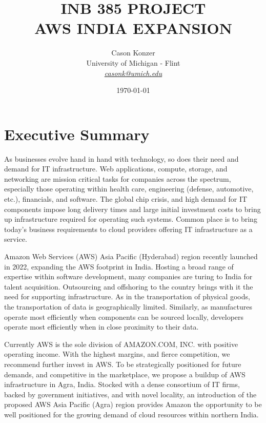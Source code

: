\documentclass[a4paper, 12pt]{article}
\date{\today} %
\begin{document}
\title{INB 385 PROJECT \\ AWS INDIA EXPANSION}
\author{Cason Konzer   \\ 
       University of Michigan - Flint \\ 
       \textit{ \color{violet}
       \href{mailto:casonk@umich.edu}{casonk@umich.edu}}  %
       }
\maketitle
\newpage

\section*{Executive Summary}

As businesses evolve hand in hand with technology, so does their need and demand for IT infrastructure. 
Web applications, compute, storage, and networking are mission critical tasks for companies across the spectrum, especially those operating within health care, engineering (defense, automotive, etc.), financials, and software. 
The global chip crisis, and high demand for IT components impose long delivery times and large initial investment costs to bring up infrastructure required for operating such systems. 
Common place is to bring today's business requirements to cloud providers offering IT infrastructure as a service. 

Amazon Web Services (AWS) Asia Pacific (Hyderabad) region recently launched in 2022, expanding the AWS footprint in India. 
Hosting a broad range of expertise within software development, many companies are turing to India for talent acquisition. 
Outsourcing and offshoring to the country brings with it the need for supporting infrastructure. 
As in the transportation of physical goods, the transportation of data is geographically limited. 
Similarly, as manufactures operate most efficiently when components can be sourced locally, developers operate most efficiently when in close proximity to their data. 

Currently AWS is the sole division of AMAZON.COM, INC. with positive operating income.
With the highest margins, and fierce competition, we recommend further invest in AWS. 
To be strategically positioned for future demands, and competitive in the marketplace, we propose a buildup of AWS infrastructure in Agra, India. 
Stocked with a dense consortium of IT firms, backed by government initiatives, and with novel locality, an introduction of the proposed AWS Asia Pacific (Agra) region provides Amazon the opportunity to be well positioned for the growing demand of cloud resources within northern India. 
\end{document}
